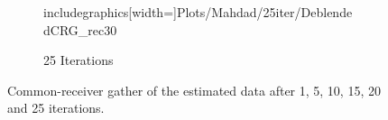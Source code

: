 \begin{figure}
\begin{subfigure}[t]{0.25\textwidth}
includegraphics[width=\textwidth]{Plots/Mahdad/25iter/DeblendedCRG_rec30}	
		\caption{25 Iterations}
		\label{fig:Ch-Theory-DeblendedCRG25}
	\end{subfigure}
	\caption{Common-receiver gather of the estimated data after 1, 5, 10, 15, 20 and 25 iterations.}
	\label{fig:Ch-Theory-EstimatedData}

\end{figure}

\FloatBarrier


